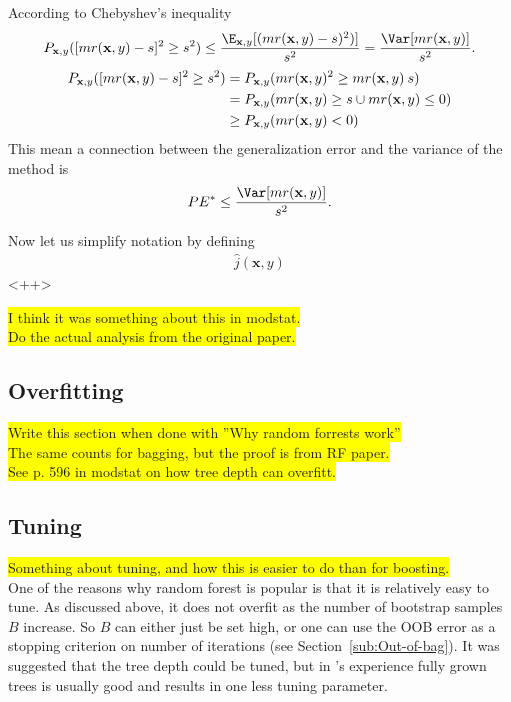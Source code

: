 According to Chebyshev's inequality 
\begin{align}
  P_{\mathbf{x}, y} ([mr(\mathbf{x}, y)-s]^2 \geq s^2) \leq 
  \frac{\E_{\mathbf{x},y}[(mr(\mathbf{x}, y) - s)^2)]}{s^2} =
  \frac{\Var[mr(\mathbf{x}, y)]}{s^2}.
\end{align}
\begin{align}
  P_{\mathbf{x}, y} ([mr(\mathbf{x}, y)-s]^2 \geq s^2)
  &= P_{\mathbf{x}, y} (mr(\mathbf{x}, y)^2 \geq mr(\mathbf{x}, y)\: s) \notag \\
  &= P_{\mathbf{x}, y} (mr(\mathbf{x}, y) \geq s  \cup mr(\mathbf{x}, y) \leq 0) \notag \\
  & \geq P_{\mathbf{x}, y} (mr(\mathbf{x}, y) < 0)
\end{align}
This mean a connection between the generalization error and the variance of the method is
\begin{align}
  PE^* \leq  \frac{\Var[mr(\mathbf{x}, y)]}{s^2}.
\end{align}

Now let us simplify notation by defining
\begin{align}
  \hat j(\mathbf{x}, y) 
\end{align}
<++>





\colorbox{yellow}{I think it was something about this in modstat.}
\\\colorbox{yellow}{Do the actual analysis from the original paper. }

\subsection{Overfitting}
\label{sub:Overfitting}
\colorbox{yellow}{Write this section when done with ''Why random forrests work''}
\\\colorbox{yellow}{The same counts for bagging, but the proof is from RF paper.}
\\\colorbox{yellow}{See p. 596 in modstat on how tree depth can overfitt.}



\subsection{Tuning}
\label{sub:Tuning}
\colorbox{yellow}{Something about tuning, and how this is easier to do than for boosting.}\\
One of the reasons why random forest is popular is that it is relatively easy to tune. As discussed above, it does not overfit as the number of bootstrap samples $B$ increase. So $B$ can either just be set high, or one can use the OOB error as a stopping criterion on number of iterations (see Section~\ref{sub:Out-of-bag}). It was suggested that the tree depth could be tuned, but in \cite{modstat}'s experience fully grown trees is usually good and results in one less tuning parameter. 


